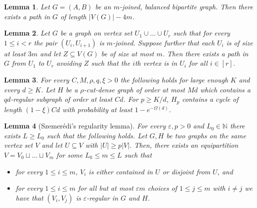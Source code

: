 \documentclass[10pt,a4paper]{amsart}
\newtheorem{lemma}{Lemma}
\begin{document}
\begin{lemma}\label{lem: DFS bipartite holes}
    Let $G=(A,B)$ be an $m$-joined, balanced bipartite graph. Then there exists a path in $G$ of length $|V(G)|-4m$.
\end{lemma}

\begin{lemma}\label{lem: regularity connector}
    Let $G$ be a graph on vertex set $U_1\cup\ldots\cup U_r$ such that for every $1\leq i< r$ the pair $(U_i,U_{i+1})$ is $m$-joined. Suppose further that each $U_i$ is of size at least $3m$ and let $Z\subseteq V(G)$ be of size at most $m$. Then there exists a path in $G$ from $U_1$ to $U_r$ avoiding $Z$ such that the $i$th vertex is in $U_i$ for all $i \in [r]$.
\end{lemma}

\begin{lemma}\label{lem:cut-dense case} For every $C,M,\rho,q,\xi>0$ the following holds for large enough $K$ and every $d\geq K$. Let $H$ be a $\rho$-cut-dense graph of order at most $Md$ which contains a $qd$-regular subgraph of order at least $Cd$. For $p\geq K/d$, $H_p$ contains a cycle of length $(1-\xi)Cd$ with probability at least $1-e^{-\Omega(d)}$.
\end{lemma}

\begin{lemma}[Szemer\'edi's regularity lemma]\label{lem: regularity}
    For every $\varepsilon,p>0$ and $L_0\in\mathbb N$ there exists $L\geq L_0$ such that the following holds. Let $G,H$ be two graphs on the same vertex set $V$ and let $U\subseteq V$ with $|U|\geq p|V|$. Then, there exists an equipartition $V=V_0\sqcup\ldots\sqcup V_m$ for some $L_0\leq m\leq L$ such that
    \begin{itemize} 
        \item for every $1\leq i\leq m$, $V_i$ is either contained in $U$ or disjoint from $U$, and 
        \item for every $1\leq i\leq m$ for all but at most $\varepsilon m$ choices of $1\leq j\leq m$ with $i\neq j$ we have that $(V_i,V_j)$ is $\varepsilon$-regular in $G$ and $H$.
    \end{itemize}
\end{lemma}
\end{document}

